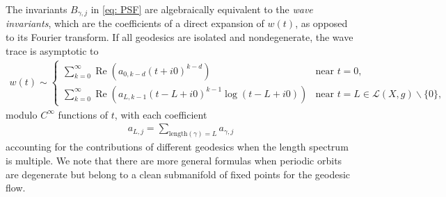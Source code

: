 \documentclass[11pt,letterpaper,oneside]{amsart}
\theoremstyle{definition}
\theoremstyle{remark}
\renewcommand{\Re}{\operatorname{Re}}
\theoremstyle{definition}
\theoremstyle{remark}
\newcommand{\CL}{\mathcal{L}}
\begin{document}
The invariants $B_{\gamma, j}$ in \eqref{eq: PSF} are algebraically equivalent to the \textit{wave invariants}, which are the coefficients of a direct expansion of $w(t)$, as opposed to its Fourier transform. If all geodesics are isolated and nondegenerate, the wave trace is asymptotic to
\begin{align*}
	 w(t) \sim \begin{cases}
	 	\sum_{k = 0}^\infty \Re \left(a_{0, k-d} (t +i0)^{k - d} \right) & \text{near}\,\, t= 0,\\
	 	\sum_{k = 0}^\infty \Re \left(a_{L, k-1} (t - L +i0)^{k - 1} \log(t - L + i 0) \right) & \text{near}\,\, t= L \in \CL(X,g) \backslash \{0\},
	 \end{cases}
\end{align*}
modulo $C^\infty$ functions of $t$, with each coefficient
\begin{align}\label{eq: sum over orbits}
	a_{L, j} = \sum_{\text{length}(\gamma) = L} a_{\gamma, j}
\end{align}
accounting for the contributions of different geodesics when the length spectrum is multiple. We note that there are more general formulas when periodic orbits are degenerate but belong to a clean submanifold of fixed points for the geodesic flow.
\end{document}
